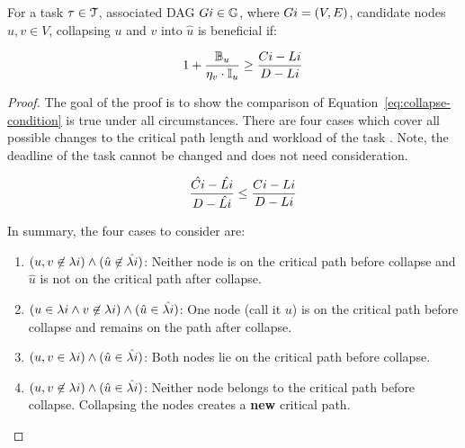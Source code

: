 \begin{theorem} For a task
  ${\task{i} \in \tasks{}}$, associated DAG ${\Dag{i} \in \dagset}$,
  where ${\Dag{i} = (V, E)}$, candidate nodes ${u,v \in V}$,
  collapsing ${u}$ and ${v}$ into ${\hat{u}}$ is beneficial if:

  \begin{equation}
    \indent
    1 + \frac{\mathbb{B}_u}{\eta_v \cdot \mathbb{I}_u}
    \ge
    \frac{\workload{i} - \criticalpathlen{i}}
         {\Deadline{i} - \criticalpathlen{i}}
    \label{eq:condition}
  \end{equation}

  \begin{proof}
    The goal of the proof is to show the comparison of
    Equation~\ref{eq:collapse-condition} is true
    under all circumstances. There are four cases which cover all
    possible changes to the critical path length and workload of the
    task . Note, the deadline of the task  cannot
    be changed and does not need consideration. 

    \begin{equation} \label{eq:collapse-condition}
      \indent
      \frac{\hat{\workload{i}} - \hat{\criticalpathlen{i}}}
           {\Deadline{i} - \hat{\criticalpathlen{i}}} \le
      \frac{\workload{i} - \criticalpathlen{i}}
           {\Deadline{i} - \criticalpathlen{i}}
    \end{equation}

    In summary, the four cases to consider are:

    \begin{enumerate}
    \item ${(u, v \not \in \criticalpath{i})
      \land
      (\hat{u} \not \in \hat{\criticalpath{i}})}$:
      Neither node is on the critical path before collapse and
      ${\hat{u}}$ is not on the critical path after collapse. 
    \item ${(u \in \criticalpath{i} \land v \not \in \criticalpath{i})
      \land
      (\hat{u} \in \hat{\criticalpath{i}})}$: One node (call it ${u}$)
      is on the critical path before collapse and remains on the path
      after collapse.
    \item ${(u,v \in \criticalpath{i}) \land
      (\hat{u} \in \hat{\criticalpath{i}})}$: Both nodes lie
      on the critical path before collapse.
    \item ${(u,v \not \in \criticalpath{i}) \land
      (\hat{u} \in \hat{\criticalpath{i}})}$: Neither node
      belongs to the critical path before collapse. Collapsing the
      nodes creates a \textbf{new} critical path.
    \end{enumerate}


\end{proof}
\end{theorem}
